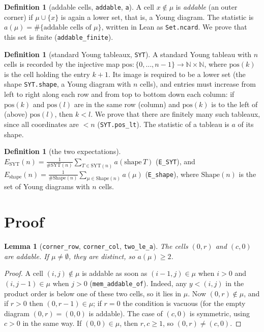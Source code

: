 \documentclass[11pt]{article}
\newtheorem{lemma}[theorem]{Lemma}
\theoremstyle{definition}
\newtheorem{definition}[theorem]{Definition}
\begin{document}
\begin{definition}[addable cells, \texttt{addable}, \texttt{a}]
A cell $x\notin\mu$ is \emph{addable} (an outer corner) if $\mu\cup\{x\}$ is again a lower set,
that is, a Young diagram. The statistic is $a(\mu)=\#\{\text{addable cells of }\mu\}$, written in Lean
as \texttt{Set.ncard}. We prove that this set is finite (\texttt{addable\_finite}).
\end{definition}

\begin{definition}[standard Young tableaux, \texttt{SYT}]
A standard Young tableau with $n$ cells is recorded by the injective map
$\mathrm{pos}:\{0,\dots,n-1\}\to\mathbb N\times\mathbb N$, where $\mathrm{pos}(k)$ is the cell holding the
entry $k+1$. Its image is required to be a lower set (the shape \texttt{SYT.shape}, a Young diagram
with $n$ cells), and entries must increase from left to right along each row and from top to
bottom down each column: if $\mathrm{pos}(k)$ and $\mathrm{pos}(l)$ are in the same row (column) and
$\mathrm{pos}(k)$ is to the left of (above) $\mathrm{pos}(l)$, then $k<l$. We prove that there are
finitely many such tableaux, since all coordinates are $<n$ (\texttt{SYT.pos\_lt}). The statistic of a
tableau is $a$ of its shape.
\end{definition}

\begin{definition}[the two expectations]
$E_{\mathrm{SYT}}(n)=\frac{1}{\#\mathrm{SYT}(n)}\sum_{T\in\mathrm{SYT}(n)} a(\mathrm{shape}\,T)$ (\texttt{E\_SYT}), and
$E_{\mathrm{shape}}(n)=\frac{1}{\#\mathrm{Shape}(n)}\sum_{\mu\in\mathrm{Shape}(n)} a(\mu)$ (\texttt{E\_shape}),
where $\mathrm{Shape}(n)$ is the set of Young diagrams with $n$ cells.
\end{definition}

\section{Proof}

\begin{lemma}[\texttt{corner\_row}, \texttt{corner\_col}, \texttt{two\_le\_a}]
The cells $(0,r)$ and $(c,0)$ are addable. If $\mu\ne\emptyset$, they are distinct, so $a(\mu)\ge 2$.
\end{lemma}
\begin{proof}
A cell $(i,j)\notin\mu$ is addable as soon as $(i-1,j)\in\mu$ when $i>0$ and $(i,j-1)\in\mu$ when
$j>0$ (\texttt{mem\_addable\_of}). Indeed, any $y<(i,j)$ in the product order is below one of these
two cells, so it lies in $\mu$. Now $(0,r)\notin\mu$, and if $r>0$ then $(0,r-1)\in\mu$; if $r=0$
the condition is vacuous (for the empty diagram $(0,r)=(0,0)$ is addable). The case of $(c,0)$ is
symmetric, using $c>0$ in the same way. If $(0,0)\in\mu$, then $r,c\ge 1$, so $(0,r)\ne(c,0)$.
\end{proof}
\end{document}
